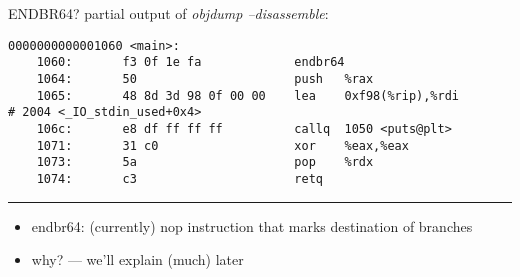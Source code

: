 \begin{frame}[fragile,label=endbr64]{ENDBR64?}
partial output of \textit{objdump --disassemble}:
\begin{Verbatim}[fontsize=\small]
0000000000001060 <main>:
    1060:       f3 0f 1e fa             endbr64 
    1064:       50                      push   %rax
    1065:       48 8d 3d 98 0f 00 00    lea    0xf98(%rip),%rdi        # 2004 <_IO_stdin_used+0x4>
    106c:       e8 df ff ff ff          callq  1050 <puts@plt>
    1071:       31 c0                   xor    %eax,%eax
    1073:       5a                      pop    %rdx
    1074:       c3                      retq   
\end{Verbatim}
\hrule
\begin{itemize}
\item endbr64: (currently) nop instruction that marks destination of branches
\item why? --- we'll explain (much) later
\end{itemize}
\end{frame}
